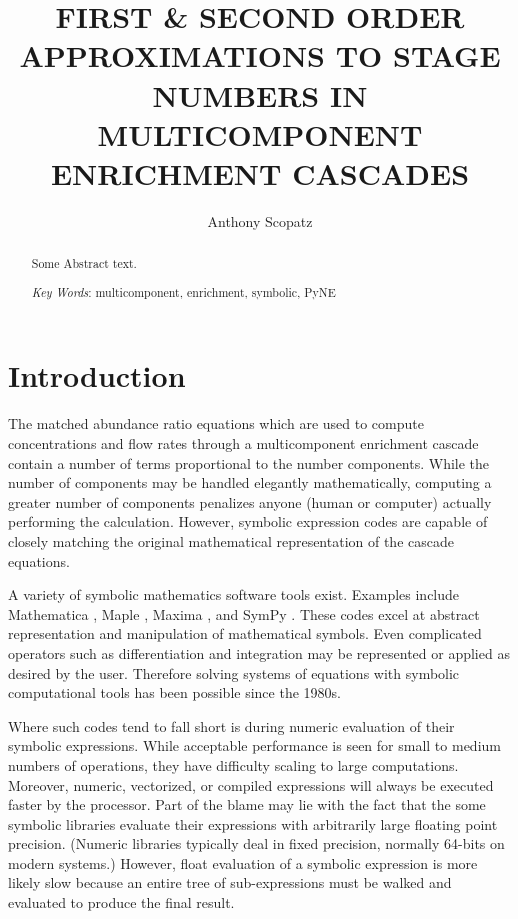 \documentclass{ansconf}
\begin{document}
\title{FIRST \& SECOND ORDER APPROXIMATIONS TO STAGE NUMBERS IN 
       MULTICOMPONENT ENRICHMENT CASCADES}

\author{Anthony Scopatz}

\maketitle

\begin{abstract}
\raggedright
Some Abstract text.

\emph{Key Words}: multicomponent, enrichment, symbolic, PyNE
\end{abstract}

\section{Introduction}
\label{sec:intro}

The matched abundance ratio equations which are used to compute concentrations and 
flow rates through a multicomponent enrichment cascade contain a number of terms 
proportional to the number components.  While the number of components may be 
handled elegantly mathematically, computing a greater number of components 
penalizes anyone (human or computer) actually performing the 
calculation.  However, 
symbolic expression codes are capable of closely matching the original 
mathematical representation of the cascade equations.

A variety of symbolic mathematics software tools exist. Examples include  
Mathematica \cite{Wolfram2008}, Maple \cite{Maple16},  Maxima \cite{Maxima5}, 
and SymPy \cite{SymPy2012}.  These codes excel at abstract representation and 
manipulation of mathematical symbols.  Even complicated operators such as 
differentiation and integration may be represented or applied as desired by the 
user.  Therefore solving systems of equations with symbolic computational tools
has been possible since the 1980s.

Where such codes tend to fall short is during numeric evaluation of 
their symbolic expressions.  While acceptable performance is seen 
for small to medium numbers of 
operations, they have difficulty scaling to large computations.  Moreover, 
numeric, vectorized, or compiled expressions will always be executed faster
by the processor.  Part of the blame may lie with the fact that the some symbolic 
libraries evaluate their 
expressions with arbitrarily large floating point precision.  (Numeric libraries
typically deal in fixed precision, normally 64-bits on modern systems.)  However, 
float evaluation of a symbolic expression is more likely slow because an entire 
tree of sub-expressions must be walked and evaluated to produce the final result.
\end{document}
